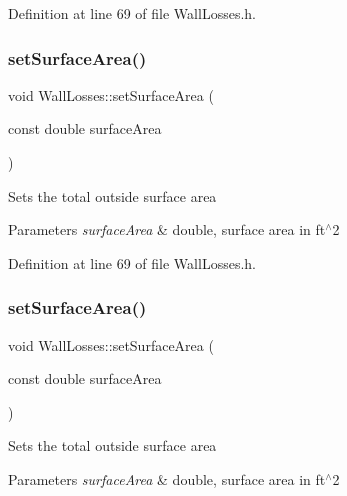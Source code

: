 Definition at line 69 of file Wall\+Losses.\+h.

\mbox{\label{class_wall_losses_acbbbe4b1ec44bb04e5e1db944017995c}} 
\subsubsection{\texorpdfstring{set\+Surface\+Area()}{setSurfaceArea()}\hspace{0.1cm}{\footnotesize\ttfamily [2/3]}}
{\footnotesize\ttfamily void Wall\+Losses\+::set\+Surface\+Area (\begin{DoxyParamCaption}\item[{const double}]{surface\+Area }\end{DoxyParamCaption})\hspace{0.3cm}{\ttfamily [inline]}}

Sets the total outside surface area 
\begin{DoxyParams}{Parameters}
{\em surface\+Area} & double, surface area in ft$^\wedge$2 \\
\hline
\end{DoxyParams}


Definition at line 69 of file Wall\+Losses.\+h.

\mbox{\label{class_wall_losses_acbbbe4b1ec44bb04e5e1db944017995c}} 
\subsubsection{\texorpdfstring{set\+Surface\+Area()}{setSurfaceArea()}\hspace{0.1cm}{\footnotesize\ttfamily [3/3]}}
{\footnotesize\ttfamily void Wall\+Losses\+::set\+Surface\+Area (\begin{DoxyParamCaption}\item[{const double}]{surface\+Area }\end{DoxyParamCaption})\hspace{0.3cm}{\ttfamily [inline]}}

Sets the total outside surface area 
\begin{DoxyParams}{Parameters}
{\em surface\+Area} & double, surface area in ft$^\wedge$2 \\
\hline
\end{DoxyParams}


